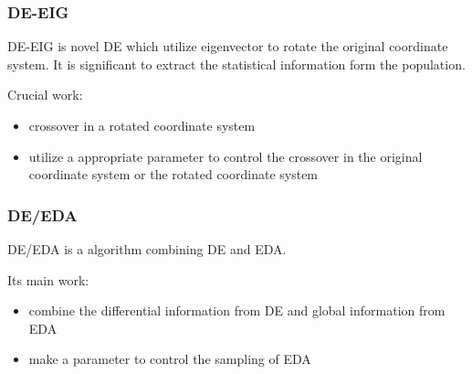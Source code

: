 \documentclass[xcolor=dvipsnames]{beamer}
\begin{document}
    \begin{frame}
    \frametitle{DE-EIG}
    DE-EIG is novel DE which utilize eigenvector to rotate the original coordinate system. It is significant to extract the statistical information form the population.
    \begin{block}{Crucial work:}
    \begin{itemize}
    \item crossover in a rotated coordinate system
    \item utilize a appropriate parameter to control the crossover in the original coordinate system or the rotated coordinate system
    \end{itemize}
    \end{block}
    \end{frame}

    \begin{frame}
    \frametitle{DE/EDA}
    DE/EDA is a algorithm combining DE and EDA. 
    
    Its main work:
    \begin{itemize}
    \item combine the differential information from DE and global information from EDA
    \item make a parameter to control the sampling of EDA
    \end{itemize}
    \end{frame}
\end{document}
